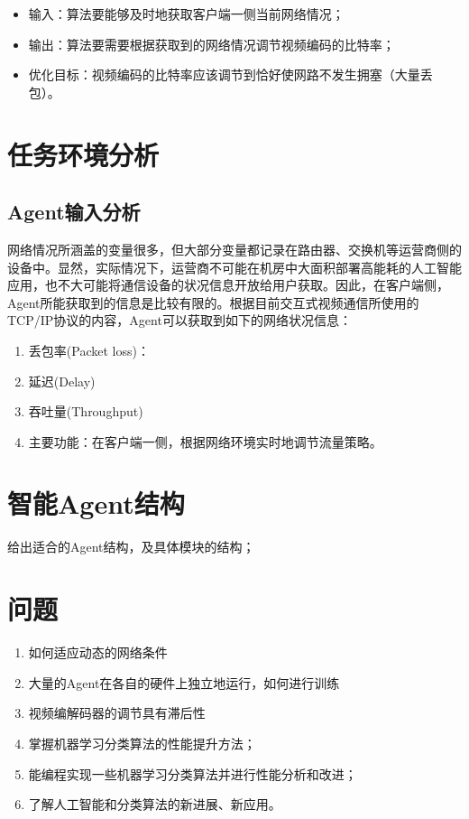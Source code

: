 \documentclass[a4paper]{ctexart}
\begin{document}
\begin{itemize}
	\item 输入：算法要能够及时地获取客户端一侧当前网络情况；
	\item 输出：算法要需要根据获取到的网络情况调节视频编码的比特率；
	\item 优化目标：视频编码的比特率应该调节到恰好使网路不发生拥塞（大量丢包）。
\end{itemize}

\section{任务环境分析}

\subsection{Agent输入分析}

网络情况所涵盖的变量很多，但大部分变量都记录在路由器、交换机等运营商侧的设备中。显然，实际情况下，运营商不可能在机房中大面积部署高能耗的人工智能应用，也不大可能将通信设备的状况信息开放给用户获取。因此，在客户端侧，Agent所能获取到的信息是比较有限的。根据目前交互式视频通信所使用的TCP/IP协议的内容，Agent可以获取到如下的网络状况信息：

\begin{enumerate}[label=\arabic*、]
	\item 丢包率(Packet loss)：
	\item 延迟(Delay)
	\item 吞吐量(Throughput)
	\item 主要功能：在客户端一侧，根据网络环境实时地调节流量策略。
\end{enumerate}

\section{智能Agent结构}
给出适合的Agent结构，及具体模块的结构；
\section{问题}
\begin{enumerate}[label=\arabic*、]
	\item 如何适应动态的网络条件
	\item 大量的Agent在各自的硬件上独立地运行，如何进行训练
	\item 视频编解码器的调节具有滞后性
	\item 掌握机器学习分类算法的性能提升方法；
	\item 能编程实现一些机器学习分类算法并进行性能分析和改进；
	\item 了解人工智能和分类算法的新进展、新应用。
\end{enumerate}
\end{document}
